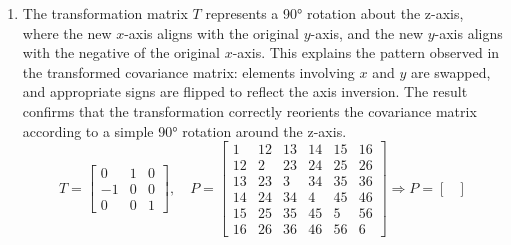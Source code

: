 \documentclass[11pt,fleqn]{report}
\begin{document}
\begin{enumerate}
{\begin{equation*}
\begin{bmatrix}
0 & 1 &0 \\
1 & 0 & 0
\end{bmatrix}, \quad
P = 
\begin{bmatrix}
 1 & 12 & 13 & 14 & 15 & 16 \\
12 &2 & 23 & 24 & 25 & 26 \\
13 & 23 &3 & 34 & 35 & 36 \\
14 & 24 & 34 &4 & 45 & 46 \\
15 & 25 & 35 & 45 &5 & 56 \\
16 & 26 & 36 & 46 & 56 &6
\end{bmatrix} \Longrightarrow
P = 
\begin{bmatrix}
 3& -23 & -13 &36 & -35 & -34 \\
 -23& 2 &12 & -26 &25 &24 \\
 -13&12 & 1 & -16 &15 &14 \\
36& -26 & -16 & 6 & -56 & -46 \\
 -35&25 &15 & -56 & 5 &45 \\
 -34&24 &14 & -46 &45 & 4
\end{bmatrix}
\end{equation*}}
\item{
The transformation matrix $T$ represents a 90° rotation about the z-axis, 
where the new $x$-axis aligns with the original $y$-axis, and the new 
$y$-axis aligns with the negative of the original $x$-axis. This explains 
the pattern observed in the transformed covariance matrix: elements 
involving $x$ and $y$ are swapped, and appropriate signs are flipped 
to reflect the axis inversion. The result confirms that the transformation 
correctly reorients the covariance matrix according to a simple 90° 
rotation around the z-axis.
\begin{equation*}
T = 
\begin{bmatrix}
0 & 1 & 0 \\
-1 & 0 & 0 \\
0 & 0 & 1
\end{bmatrix}, \quad
P = 
\begin{bmatrix}
 1 & 12 & 13 & 14 & 15 & 16 \\
12 &2 & 23 & 24 & 25 & 26 \\
13 & 23 &3 & 34 & 35 & 36 \\
14 & 24 & 34 &4 & 45 & 46 \\
15 & 25 & 35 & 45 &5 & 56 \\
16 & 26 & 36 & 46 & 56 &6
\end{bmatrix} \Longrightarrow
P = 
\begin{bmatrix}

\end{bmatrix}
\end{equation*}}
\end{enumerate}
\end{document}
